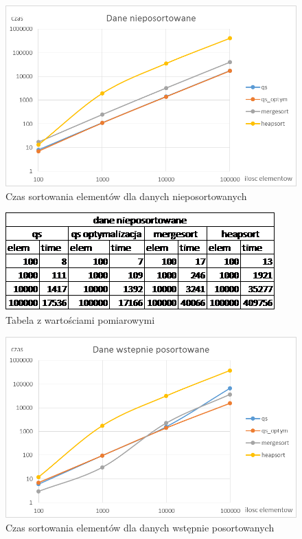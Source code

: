 \documentclass[a4paper,10pt]{scrartcl}
\begin{document}
\pagebreak

\begin{landscape}
\begin{figure}
 \centering
  \includegraphics[scale=1]{wyk1}
 \caption{Czas sortowania elementów dla danych nieposortowanych}
\end{figure}

\pagebreak

\begin{figure}
 \centering
  \includegraphics[scale=1]{tab1}
 \caption{Tabela z wartościami pomiarowymi}
\end{figure}

\begin{figure}
 \centering
  \includegraphics[scale=1]{wyk2}
 \caption{Czas sortowania elementów dla danych wstępnie posortowanych}
\end{figure}


\end{landscape}
\end{document}
